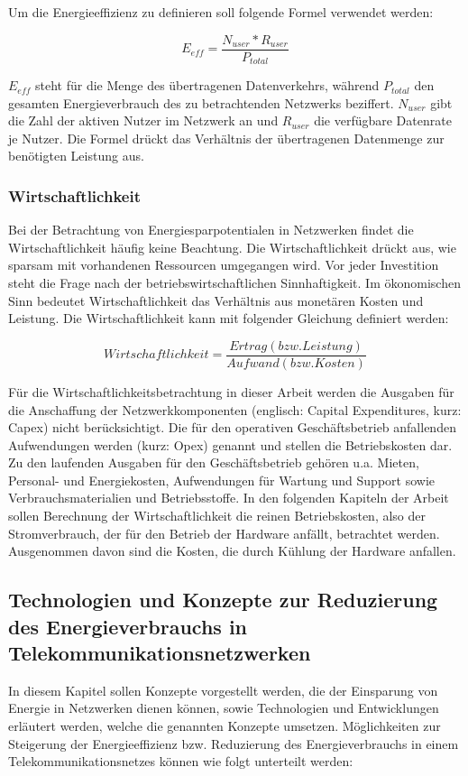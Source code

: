 Um die Energieeffizienz zu definieren soll folgende Formel verwendet werden:

\begin{equation}
E_{eff}=\frac{N_{user}*R_{user}}{P_{total}}
\end{equation}

$E_{eff}$ steht für die Menge des übertragenen Datenverkehrs, während $P_{total}$ den gesamten Energieverbrauch des zu betrachtenden Netzwerks beziffert. $N_{user}$ gibt die Zahl der aktiven Nutzer im Netzwerk an und $R_{user}$ die verfügbare Datenrate je Nutzer. \cite{aleksic2013}
Die Formel drückt das Verhältnis der übertragenen Datenmenge zur benötigten Leistung aus.

\subsubsection{Wirtschaftlichkeit}
Bei der Betrachtung von Energiesparpotentialen in Netzwerken findet die Wirtschaftlichkeit häufig keine Beachtung. Die Wirtschaftlichkeit drückt aus, wie sparsam mit vorhandenen Ressourcen umgegangen wird.  Vor jeder Investition steht die Frage nach der betriebswirtschaftlichen Sinnhaftigkeit. Im ökonomischen Sinn bedeutet Wirtschaftlichkeit das Verhältnis aus monetären Kosten und Leistung. Die Wirtschaftlichkeit kann mit folgender Gleichung definiert werden:

\begin{equation}
Wirtschaftlichkeit=\frac{Ertrag (bzw. Leistung)}{Aufwand(bzw. Kosten)}
\end{equation}


Für die Wirtschaftlichkeitsbetrachtung in dieser Arbeit werden die Ausgaben für die Anschaffung der Netzwerkkomponenten (englisch: Capital Expenditures, kurz: Capex) nicht be\-rück\-sich\-tigt. Die für den operativen Geschäftsbetrieb anfallenden Aufwendungen werden  (kurz: Opex) genannt und stellen die Betriebskosten dar. Zu den laufenden Ausgaben für den Geschäfts\-betrieb gehören u.a. Mieten, Personal- und Energiekosten, Aufwendungen für Wartung und Support sowie Verbrauchsmaterialien und Betriebsstoffe. In den folgenden Kapiteln der Arbeit sollen Berechnung der Wirtschaftlichkeit die reinen Betriebskosten, also der Stromverbrauch, der für den Betrieb der Hardware anfällt, betrachtet werden. Ausgenommen davon sind die Kosten, die durch Kühlung der Hardware anfallen. 


\subsection{Technologien und Konzepte zur Reduzierung des Energieverbrauchs in Telekommunikationsnetzwerken}
In diesem Kapitel sollen Konzepte vorgestellt werden, die der Einsparung von Energie in Netzwerken dienen können, sowie Technologien und Entwicklungen erläutert werden, welche die genannten Konzepte umsetzen. Möglichkeiten zur Steigerung der Energieeffizienz bzw. Reduzierung des Energieverbrauchs in einem Telekommunikationsnetzes können wie folgt unterteilt werden:	

